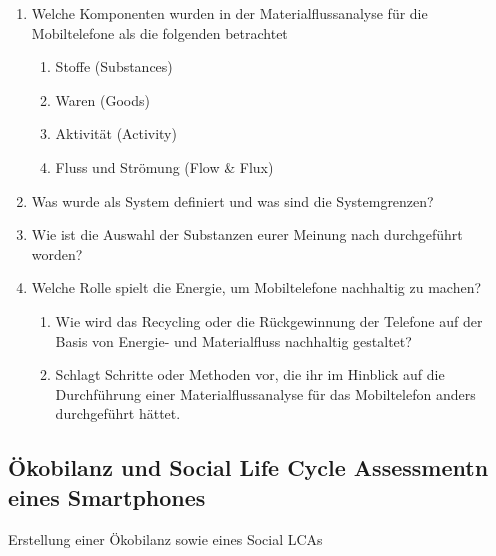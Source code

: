 \documentclass[DIV=15,headinclude=true]{scrartcl}
\begin{document}
\begin{enumerate}
	\item
	      Welche Komponenten wurden in der Materialflussanalyse für die
	      Mobiltelefone als die folgenden betrachtet

	      \begin{enumerate}
		      \item
		            Stoffe (Substances)
		      \item
		            Waren (Goods)
		      \item
		            Aktivität (Activity)
		      \item
		            Fluss und Strömung (Flow \& Flux)
	      \end{enumerate}
	\item
	      Was wurde als System definiert und was sind die Systemgrenzen?
	\item
	      Wie ist die Auswahl der Substanzen eurer Meinung nach durchgeführt
	      worden?
	\item
	      Welche Rolle spielt die Energie, um Mobiltelefone nachhaltig zu
	      machen?

	      \begin{enumerate}
		      \item
		            Wie wird das Recycling oder die Rückgewinnung der Telefone auf der
		            Basis von Energie- und Materialfluss nachhaltig gestaltet?
		      \item
		            Schlagt Schritte oder Methoden vor, die ihr im Hinblick auf die
		            Durchführung einer Materialflussanalyse für das Mobiltelefon anders
		            durchgeführt hättet.
	      \end{enumerate}
\end{enumerate}

\subsection{Ökobilanz und Social Life Cycle Assessmentn eines Smartphones}

Erstellung einer Ökobilanz sowie eines Social LCAs
\end{document}
